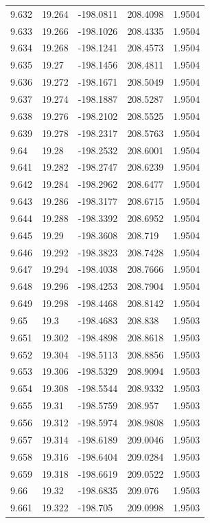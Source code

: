 \begin{tabular}{lllll}
9.632 & 19.264 & -198.0811 & 208.4098 & 1.9504 \\
9.633 & 19.266 & -198.1026 & 208.4335 & 1.9504 \\
9.634 & 19.268 & -198.1241 & 208.4573 & 1.9504 \\
9.635 & 19.27 & -198.1456 & 208.4811 & 1.9504 \\
9.636 & 19.272 & -198.1671 & 208.5049 & 1.9504 \\
9.637 & 19.274 & -198.1887 & 208.5287 & 1.9504 \\
9.638 & 19.276 & -198.2102 & 208.5525 & 1.9504 \\
9.639 & 19.278 & -198.2317 & 208.5763 & 1.9504 \\
9.64 & 19.28 & -198.2532 & 208.6001 & 1.9504 \\
9.641 & 19.282 & -198.2747 & 208.6239 & 1.9504 \\
9.642 & 19.284 & -198.2962 & 208.6477 & 1.9504 \\
9.643 & 19.286 & -198.3177 & 208.6715 & 1.9504 \\
9.644 & 19.288 & -198.3392 & 208.6952 & 1.9504 \\
9.645 & 19.29 & -198.3608 & 208.719 & 1.9504 \\
9.646 & 19.292 & -198.3823 & 208.7428 & 1.9504 \\
9.647 & 19.294 & -198.4038 & 208.7666 & 1.9504 \\
9.648 & 19.296 & -198.4253 & 208.7904 & 1.9504 \\
9.649 & 19.298 & -198.4468 & 208.8142 & 1.9504 \\
9.65 & 19.3 & -198.4683 & 208.838 & 1.9503 \\
9.651 & 19.302 & -198.4898 & 208.8618 & 1.9503 \\
9.652 & 19.304 & -198.5113 & 208.8856 & 1.9503 \\
9.653 & 19.306 & -198.5329 & 208.9094 & 1.9503 \\
9.654 & 19.308 & -198.5544 & 208.9332 & 1.9503 \\
9.655 & 19.31 & -198.5759 & 208.957 & 1.9503 \\
9.656 & 19.312 & -198.5974 & 208.9808 & 1.9503 \\
9.657 & 19.314 & -198.6189 & 209.0046 & 1.9503 \\
9.658 & 19.316 & -198.6404 & 209.0284 & 1.9503 \\
9.659 & 19.318 & -198.6619 & 209.0522 & 1.9503 \\
9.66 & 19.32 & -198.6835 & 209.076 & 1.9503 \\
9.661 & 19.322 & -198.705 & 209.0998 & 1.9503 \\

\end{tabular}
